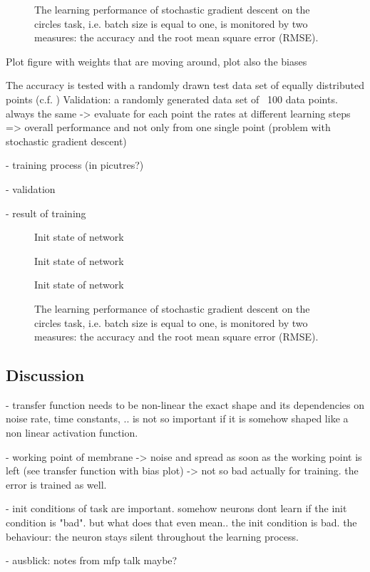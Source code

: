 \begin{figure}
	\centering
	\label{network_monitoring}
    
	\caption{The learning performance of stochastic gradient descent on the circles task, i.e. batch size is equal to one, is monitored by two measures: the accuracy and the root mean square error (RMSE).}
\end{figure}



Plot figure with weights that are moving around, plot also the biases

The accuracy is tested with a randomly drawn test data set of equally distributed points (c.f. )
Validation:
a randomly generated data set of ~100 data points. always the same -> evaluate for each point the rates at different learning steps => overall performance and not only from one single point (problem with stochastic gradient descent)

- training process (in picutres?)

- validation

- result of training
\begin{figure}
	\label{learning_process_s5}
	
	\caption{Init state of network}
\end{figure}
\begin{figure}
	\label{learning_process_s500}
	
	\caption{Init state of network}
\end{figure}
\begin{figure}
	\label{learning_process_s2500}
	
	\caption{Init state of network}
\end{figure}


\begin{figure}
	\label{circles_acc}
	\begin{center}
		
	\end{center}
	\caption{The learning performance of stochastic gradient descent on the circles task, i.e. batch size is equal to one, is monitored by two measures: the accuracy and the root mean square error (RMSE).}
\end{figure}
\subsection{Discussion}

- transfer function needs to be non-linear the exact shape and its dependencies on noise rate, time constants, .. is not so important if it is somehow shaped like a non linear activation function.

- working point of membrane -> noise and spread as soon as the working point is left (see transfer function with bias plot) -> not so bad actually for training. the error is trained as well. 

- init conditions of task are important. somehow neurons dont learn if the init condition is "bad". but what does that even  mean.. the init condition is bad. the behaviour: the neuron stays silent throughout the learning process. 

- ausblick: notes from mfp talk maybe?